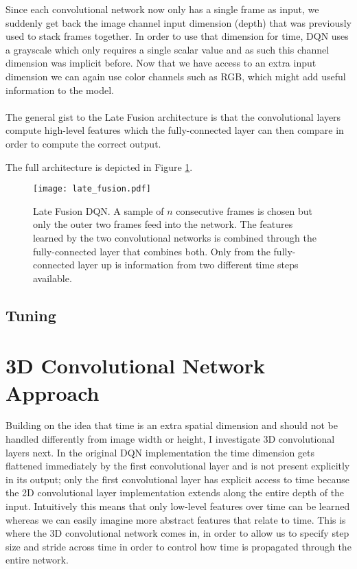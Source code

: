 Since each convolutional network now only has a single frame as input,
we suddenly get back the image channel input dimension (depth)
that was previously used to stack frames together.
In order to use that dimension for time,
DQN uses a grayscale
which only requires a single scalar value
and as such this channel dimension was implicit before.
Now that we have access to an extra input dimension
we can again use color channels
such as RGB,
which might add useful information to the model.

\paragraph{}
The general gist to the Late Fusion architecture
is that the convolutional layers
compute high-level features
which the fully-connected layer can then compare
in order to compute the correct output.

The full architecture is depicted in Figure \ref{fig:late_fusion}.

\begin{figure}[htpb]
  \centering
  \texttt{[image: late\_fusion.pdf]}
  \caption{
    Late Fusion DQN.
    A sample of $n$ consecutive frames is chosen
    but only the outer two frames
    feed into the network.
    The features learned by the two convolutional networks
    is combined through the fully-connected layer
    that combines both.
    Only from the fully-connected layer up
    is information from two different time steps available.
  }
  \label{fig:late_fusion}
\end{figure}

\subsection{Tuning}
\label{sub:late_fusion_tuning}


\section{3D Convolutional Network Approach}
\label{sec:3d_convolutional_network_approach}
Building on the idea that time is an extra spatial dimension
and should not be handled differently
from image width or height,
I investigate 3D convolutional layers next.
In the original DQN implementation
the time dimension gets flattened immediately
by the first convolutional layer
and is not present explicitly
in its output;
only the first convolutional layer
has explicit access to time
because the 2D convolutional layer implementation
extends along the entire depth of the input.
Intuitively this means that only low-level
features over time can be learned
whereas we can easily imagine
more abstract features
that relate to time.
This is where the 3D convolutional network comes in,
in order to allow us to specify step size and stride across time
in order to control how time is propagated through the entire network.

